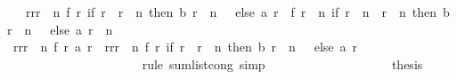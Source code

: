 \begin{isabellebody}
\ {\isachardoublequoteopen}{\isachardot}{\isachardot}{\isachardot}\ {\isacharequal}\ {\isacharparenleft}{\isasymSum}r{\isacharprime}{\isasymleftarrow}{\isacharbrackleft}r{}{\isachardot}{\isachardot}{\isacharless}r{}\ {\isacharplus}\ n{\isacharbrackright}{\isachardot}\ f\ r{\isacharprime}\ {\isacharparenleft}if\ r{\isacharprime}\ {\isacharequal}\ r{}\ {\isacharplus}\ n\ then\ b\ {\isacharparenleft}r{}\ {\isacharplus}\ n\ {\isacharminus}\ {}{\isacharparenright}\ else\ {\isacharparenleft}a\ r{\isacharprime}{\isacharparenright}{\isacharparenright}{\isacharparenright}\ {\isacharplus}\ f\ {\isacharparenleft}r{}\ {\isacharplus}\ n{\isacharparenright}\ {\isacharparenleft}if\ r{}\ {\isacharplus}\ n\ {\isacharequal}\ r{}\ {\isacharplus}\ n\ then\ b\ {\isacharparenleft}r{}\ {\isacharplus}\ n\ {\isacharminus}\ {}{\isacharparenright}\ else\ {\isacharparenleft}a\ {\isacharparenleft}r{}\ {\isacharplus}\ n{\isacharparenright}{\isacharparenright}{\isacharparenright}{\isachardoublequoteclose}\isanewline
\ \ \ \ \ \ \ \ \ \ \ \ \ \ \ \ \isamarkupfalse%
{\isacharminus}\isanewline
\ \ \ \ \ \ \ \ \ \ \ \ \ \ \ \ \ \ \isamarkupfalse%
\ {\isachardoublequoteopen}{\isacharparenleft}{\isasymSum}r{\isacharprime}{\isasymleftarrow}{\isacharbrackleft}r{}{\isachardot}{\isachardot}{\isacharless}r{}\ {\isacharplus}\ n{\isacharbrackright}{\isachardot}\ f\ r{\isacharprime}\ {\isacharparenleft}a\ r{\isacharprime}{\isacharparenright}{\isacharparenright}\ {\isacharequal}\ {\isacharparenleft}{\isasymSum}r{\isacharprime}{\isasymleftarrow}{\isacharbrackleft}r{}{\isachardot}{\isachardot}{\isacharless}r{}\ {\isacharplus}\ n{\isacharbrackright}{\isachardot}\ f\ r{\isacharprime}\ {\isacharparenleft}if\ r{\isacharprime}\ {\isacharequal}\ r{}\ {\isacharplus}\ n\ then\ b\ {\isacharparenleft}r{}\ {\isacharplus}\ n\ {\isacharminus}\ {}{\isacharparenright}\ else\ {\isacharparenleft}a\ r{\isacharprime}{\isacharparenright}{\isacharparenright}{\isacharparenright}{\isachardoublequoteclose}\isanewline
\ \ \ \ \ \ \ \ \ \ \ \ \ \ \ \ \ \ \ \ \isamarkupfalse%
\ {\isacharparenleft}rule\ sum{\isacharunderscore}list{\isacharunderscore}cong{\isacharcomma}\ simp{\isacharparenright}\isanewline
\ \ \ \ \ \ \ \ \ \ \ \ \ \ \ \ \ \ \isamarkupfalse%
\ {\isacharquery}thesis\isanewline
\ \ \ \ \ \ \ \ \ \ \ \ \ \ \ \ \ \ \ \ \isamarkupfalse%

\end{isabellebody}
